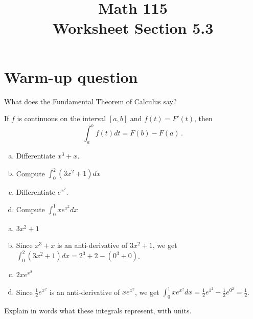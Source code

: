 \documentclass[11pt]{exam}
\title{\vspace{-0.5in} Math 115 \\ Worksheet Section 5.3}
\date{}
\begin{document}
\maketitle
\vspace{-0.75in}
\section*{Warm-up question}
\noindent
What does the Fundamental Theorem of Calculus say?
\begin{solution}
 If \(f\) is continuous on the interval \([a,b]\) and \(f(t) =
 F'(t)\), then \[
   \int_a^b f(t) dt = F(b) - F(a) \,.
 \]
\end{solution}
\vspace{4em}
\begin{questions}
  \question 
    \begin{multicols}{2}
\begin{enumerate}[(a)]
\item Differentiate $x^3+x$.
\item Compute $\displaystyle\int_0^2(3x^2+1)dx$
\item Differentiate $e^{x^2}$.
\item Compute $\displaystyle\int_0^1 xe^{x^2}dx$
\end{enumerate}	
\end{multicols}
\begin{solution}
  \begin{enumerate}[(a)]
  \item \(3x^2+1\)
  \item Since \(x^3+x\) is an anti-derivative of \(3x^2+1\), we get
    \(\int_0^2 (3x^2+1) dx = 2^3+2 - (0^3+0)\). 
  \item \(2x e^{x^2}\)
  \item Since \(\frac{1}{2} e^{x^2}\) is an anti-derivative of \(x
    e^{x^2}\), we get \(\int_0^1 x e^{x^2} dx =
    \frac{1}{2}e^{1^2}-\frac{1}{2}e^{0^2} = \frac{1}{2}\).
  \end{enumerate}
\end{solution}
  \question Explain in words what these integrals represent, with units.
\end{questions}
\end{document}
